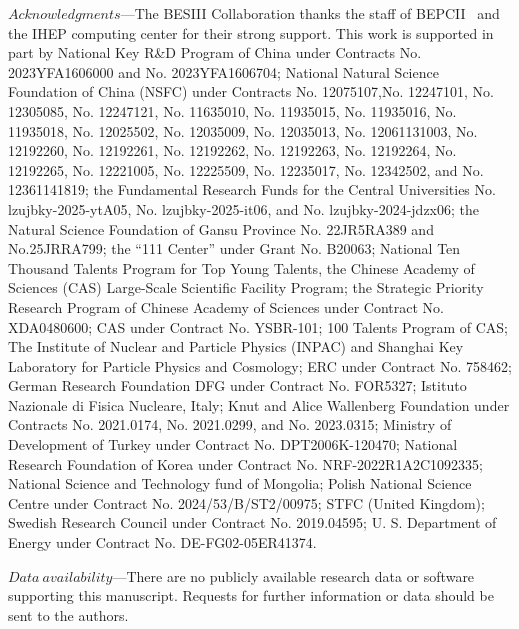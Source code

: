 \documentclass[prd,aps,reprint,noeprint,superscriptaddress,amsmath, amssymb]{revtex4-1}
\begin{document}
$Acknowledgments$---The BESIII Collaboration thanks the staff of BEPCII~\cite{BEPCII:link} and the IHEP computing center for their strong support. This work is supported in part by
National Key R\&D Program of China under Contracts No. 2023YFA1606000 and No. 2023YFA1606704; National Natural Science Foundation of China (NSFC) under Contracts No. 12075107,No. 12247101, No. 12305085, No. 12247121, No. 11635010, No. 11935015, No. 11935016, No. 11935018, No. 12025502, No. 12035009, No. 12035013, No. 12061131003, No. 12192260, No. 12192261, No. 12192262, No. 12192263, No. 12192264, No. 12192265, No. 12221005, No. 12225509, No. 12235017, No. 12342502, and No. 12361141819;
the Fundamental Research Funds for the Central Universities No. lzujbky-2025-ytA05, No. lzujbky-2025-it06, and No. lzujbky-2024-jdzx06;
the Natural Science Foundation of Gansu Province No. 22JR5RA389 and No.25JRRA799;
the ``111 Center'' under Grant No. B20063;
National Ten Thousand Talents Program for Top Young Talents,
the Chinese Academy of Sciences (CAS) Large-Scale Scientific Facility Program; the Strategic Priority Research Program of Chinese Academy of Sciences under Contract No. XDA0480600; CAS under Contract No. YSBR-101; 100 Talents Program of CAS; The Institute of Nuclear and Particle Physics (INPAC) and Shanghai Key Laboratory for Particle Physics and Cosmology; ERC under Contract No. 758462; German Research Foundation DFG under Contract No. FOR5327; Istituto Nazionale di Fisica Nucleare, Italy; Knut and Alice Wallenberg Foundation under Contracts No. 2021.0174, No. 2021.0299, and No. 2023.0315; Ministry of Development of Turkey under Contract No. DPT2006K-120470; National Research Foundation of Korea under Contract No. NRF-2022R1A2C1092335; National Science and Technology fund of Mongolia; Polish National Science Centre under Contract No. 2024/53/B/ST2/00975; STFC (United Kingdom); Swedish Research Council under Contract No. 2019.04595; U. S. Department of Energy under Contract No. DE-FG02-05ER41374.


$Data~availability$---There are no publicly available research data or software supporting this manuscript. Requests for further information or data should be sent to the authors.





\end{document}
